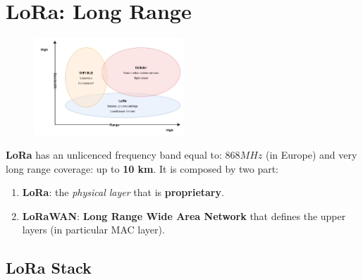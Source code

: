 \newpage
\section{LoRa: Long Range}

\begin{figure}[h]
    \centering
    \includegraphics[width=0.5\textwidth]{img/lora}
\end{figure}
\textbf{LoRa} has an unlicenced frequency band equal to: $868MHz$ (in Europe) and very long range coverage: up to \textbf{10 km}. It is composed by two part:
\begin{enumerate}[nosep]
    \item \textbf{LoRa}: the \textit{physical layer} that is \textbf{proprietary}.
    \item \textbf{LoRaWAN}: \textbf{Long Range Wide Area Network} that defines the upper layers (in particular MAC layer).
\end{enumerate}

\newpage
\subsection{LoRa Stack}

